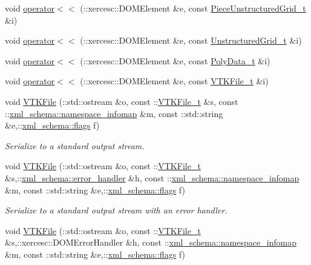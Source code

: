 \begin{DoxyCompactItemize}
\item 
void \hyperlink{vtk-unstructured_8cpp_a145ab456a0b4837b55ff6755514fd7d4}{operator$<$$<$} (\+::xercesc\+::\+D\+O\+M\+Element \&e, const \hyperlink{classPieceUnstructuredGrid__t}{Piece\+Unstructured\+Grid\+\_\+t} \&i)
\item 
void \hyperlink{vtk-unstructured_8cpp_a53b72fe6aa7e7f479b37e10e807fe4f4}{operator$<$$<$} (\+::xercesc\+::\+D\+O\+M\+Element \&e, const \hyperlink{classUnstructuredGrid__t}{Unstructured\+Grid\+\_\+t} \&i)
\item 
void \hyperlink{vtk-unstructured_8cpp_abece001f0a506ac3847ede9a0a72d81d}{operator$<$$<$} (\+::xercesc\+::\+D\+O\+M\+Element \&e, const \hyperlink{classPolyData__t}{Poly\+Data\+\_\+t} \&i)
\item 
void \hyperlink{vtk-unstructured_8cpp_ac655f285f1cdc6fc044b7d58a7596a6a}{operator$<$$<$} (\+::xercesc\+::\+D\+O\+M\+Element \&e, const \hyperlink{classVTKFile__t}{V\+T\+K\+File\+\_\+t} \&i)
\item 
void \hyperlink{vtk-unstructured_8cpp_a60fc47cfc610f6c31dfd3b0c12892e49}{V\+T\+K\+File} (\+::std\+::ostream \&o, const \+::\hyperlink{classVTKFile__t}{V\+T\+K\+File\+\_\+t} \&s, const \+::\hyperlink{namespacexml__schema_ad52b6e3505153cb30ba3452f7868450e}{xml\+\_\+schema\+::namespace\+\_\+infomap} \&m, const \+::std\+::string \&e,\+::\hyperlink{namespacexml__schema_a8d981c127a1f5106d04ad5853e707361}{xml\+\_\+schema\+::flags} f)
\begin{DoxyCompactList}\small\item\em Serialize to a standard output stream. \end{DoxyCompactList}\item 
void \hyperlink{vtk-unstructured_8cpp_abe499904eca404dadf8429281c88a3a2}{V\+T\+K\+File} (\+::std\+::ostream \&o, const \+::\hyperlink{classVTKFile__t}{V\+T\+K\+File\+\_\+t} \&s,\+::\hyperlink{namespacexml__schema_abdee01986b8e16f04af47dd12038261e}{xml\+\_\+schema\+::error\+\_\+handler} \&h, const \+::\hyperlink{namespacexml__schema_ad52b6e3505153cb30ba3452f7868450e}{xml\+\_\+schema\+::namespace\+\_\+infomap} \&m, const \+::std\+::string \&e,\+::\hyperlink{namespacexml__schema_a8d981c127a1f5106d04ad5853e707361}{xml\+\_\+schema\+::flags} f)
\begin{DoxyCompactList}\small\item\em Serialize to a standard output stream with an error handler. \end{DoxyCompactList}\item 
void \hyperlink{vtk-unstructured_8cpp_af6a299b24ebe8c1465bc6164376a10bc}{V\+T\+K\+File} (\+::std\+::ostream \&o, const \+::\hyperlink{classVTKFile__t}{V\+T\+K\+File\+\_\+t} \&s,\+::xercesc\+::\+D\+O\+M\+Error\+Handler \&h, const \+::\hyperlink{namespacexml__schema_ad52b6e3505153cb30ba3452f7868450e}{xml\+\_\+schema\+::namespace\+\_\+infomap} \&m, const \+::std\+::string \&e,\+::\hyperlink{namespacexml__schema_a8d981c127a1f5106d04ad5853e707361}{xml\+\_\+schema\+::flags} f)

\end{DoxyCompactItemize}
